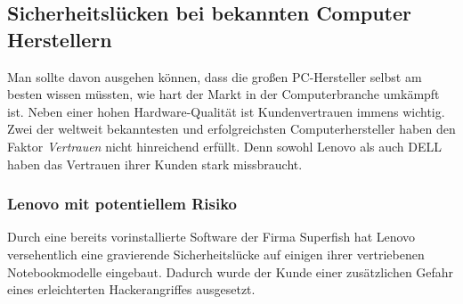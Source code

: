 \subsection{Sicherheitslücken bei bekannten Computer Herstellern}
Man sollte davon ausgehen können, dass die großen PC-Hersteller selbst am besten wissen müssten, wie hart der Markt in der Computerbranche umkämpft ist. Neben einer hohen Hardware-Qualität ist Kundenvertrauen immens wichtig. Zwei der weltweit bekanntesten und erfolgreichsten Computerhersteller \cite[vgl.]{pc_hersteller} haben den Faktor \textit{Vertrauen} nicht hinreichend erfüllt. Denn sowohl Lenovo als auch DELL haben das Vertrauen ihrer Kunden stark missbraucht. 

\subsubsection{Lenovo mit potentiellem Risiko}
Durch eine bereits vorinstallierte Software der Firma Superfish hat Lenovo versehentlich eine gravierende Sicherheitslücke auf einigen ihrer vertriebenen Notebookmodelle eingebaut. Dadurch wurde der Kunde einer zusätzlichen Gefahr eines erleichterten Hackerangriffes ausgesetzt.


